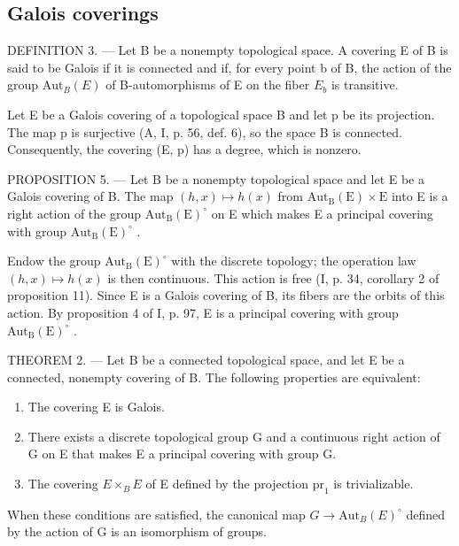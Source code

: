 \subsection{Galois coverings}

DEFINITION 3. --- Let B be a nonempty topological space. A covering E of B is said to be Galois if it is connected and if, for every point b of B, the action of the group \(\mathrm{Aut}_{B}(E)\) of B-automorphisms of E on the fiber \(E_{b}\) is transitive.

Let E be a Galois covering of a topological space B and let p be its projection. The map p is surjective (A, I, p. 56, def. 6), so the space B is connected. Consequently, the covering (E, p) has a degree, which is nonzero.

PROPOSITION 5. --- Let B be a nonempty topological space and let E be a Galois covering of B. The map \((h,x)\mapsto h(x)\) from \(\mathrm{Aut}_{\mathrm{B}}(\mathrm{E})\times\mathrm{E}\) into E is a right action of the group \(\mathrm{Aut}_{\mathrm{B}}(\mathrm{E})^{\circ}\) on E which makes E a principal covering with group \(\mathrm{Aut}_{\mathrm{B}}(\mathrm{E})^{\circ}\) .

Endow the group \(\mathrm{Aut}_{\mathrm{B}}(\mathrm{E})^{\circ}\) with the discrete topology; the operation law \((h,x)\mapsto h(x)\) is then continuous. This action is free (I, p. 34, corollary 2 of proposition 11). Since E is a Galois covering of B, its fibers are the orbits of this action. By proposition 4 of I, p. 97, E is a principal covering with group \(\mathrm{Aut}_{\mathrm{B}}(\mathrm{E})^{\circ}\) .

THEOREM 2. --- Let B be a connected topological space, and let E be a connected, nonempty covering of B. The following properties are equivalent:

\begin{enumerate}
\def\labelenumi{(\roman{enumi})}
\item
  The covering E is Galois.
\item
  There exists a discrete topological group G and a continuous right action of G on E that makes E a principal covering with group G.
\item
  The covering \(E \times_{B} E\) of E defined by the projection \(\mathrm{pr}_{1}\) is trivializable.
\end{enumerate}

When these conditions are satisfied, the canonical map \(G \to \mathrm{Aut}_{B}(E)^{\circ}\) defined by the action of G is an isomorphism of groups.

